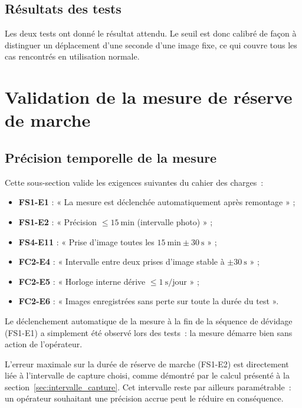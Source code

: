 \subsection*{Résultats des tests}

Les deux tests ont donné le résultat attendu. Le seuil est donc calibré de façon à distinguer un déplacement d'une seconde d'une image fixe, ce qui couvre tous les cas rencontrés en utilisation normale.


\section{Validation de la mesure de réserve de marche}
\label{sec:valid-mesure}

\subsection{Précision temporelle de la mesure}

Cette sous-section valide les exigences suivantes du cahier des charges~:
\begin{itemize}
    \item \textbf{FS1-E1} : « La mesure est déclenchée automatiquement après
          remontage » ;
    \item \textbf{FS1-E2} : « Précision $\leq 15\ \mathrm{min}$ (intervalle
          photo) » ;
    \item \textbf{FS4-E11} : « Prise d'image toutes les $15\ \mathrm{min} \pm
          30\ \mathrm{s}$ » ;
    \item \textbf{FC2-E4} : « Intervalle entre deux prises d'image stable à
          $\pm 30\ \mathrm{s}$ » ;
    \item \textbf{FC2-E5} : « Horloge interne dérive $\leq 1\ \mathrm{s/jour}$ » ;
    \item \textbf{FC2-E6} : « Images enregistrées sans perte sur toute la
          durée du test ».
\end{itemize}

Le déclenchement automatique de la mesure à la fin de la séquence de dévidage
(FS1-E1) a simplement été observé lors des tests~: la mesure démarre bien
sans action de l'opérateur.

L'erreur maximale sur la durée de réserve de marche (FS1-E2) est directement
liée à l'intervalle de capture choisi, comme démontré par le calcul présenté à
la section~\ref{sec:intervalle_capture}. Cet intervalle reste par ailleurs
paramétrable~: un opérateur souhaitant une précision accrue peut le réduire en
conséquence.

